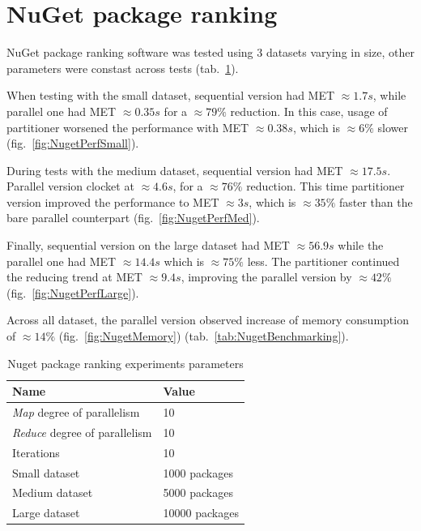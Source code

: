 \label{sec: NuGet}
\section{NuGet package ranking}
NuGet package ranking software was tested using 3 datasets varying in size, other parameters were constast across tests (tab.~\ref{tab:NuGetParameters}). 

When testing with the small dataset, sequential version had MET $\approx 1.7s$, while parallel one had MET $\approx 0.35s$ for a $\approx 79\%$ reduction. 
In this case, usage of partitioner worsened the performance with MET $\approx 0.38s$, which is $\approx 6\%$ slower (fig.~\ref{fig:NugetPerfSmall}). 

During tests with the medium dataset, sequential version had MET $\approx 17.5 s$. Parallel version clocket at $\approx 4.6s$, for a $\approx 76\%$ 
reduction. This time partitioner version improved the performance to MET $ \approx 3s$, which is $\approx 35\%$ faster than the bare parallel 
counterpart (fig.~\ref{fig:NugetPerfMed}). 

Finally, sequential version on the large dataset had MET $\approx 56.9s$ while the parallel one had MET $\approx 14.4s$ which is $\approx 75\%$ less.
The partitioner continued the reducing trend at MET $\approx 9.4s$, improving the parallel version by $\approx 42 \%$ (fig.~\ref{fig:NugetPerfLarge}). 

Across all dataset, the parallel version observed increase of memory consumption of $\approx 14\%$ (fig.~\ref{fig:NugetMemory}) (tab.~\ref{tab:NugetBenchmarking}).
\begin{table}[!ht]
    \centering
    \caption{Nuget package ranking experiments parameters}
		\label{tab:NuGetParameters}
    \begin{tabular}{p{5cm}p{3cm}}
			\toprule
			\bfseries Name 	&
			\bfseries Value \\
			\midrule
			\emph{Map} degree of parallelism & 10 \\
			\emph{Reduce} degree of parallelism & 10 \\
			Iterations & 10 \\ 
			Small dataset  & 1000 packages  \\	
			Medium dataset  & 5000 packages  \\	
			Large dataset  & 10000 packages  \\	
			\bottomrule
    \end{tabular}
\end{table}

